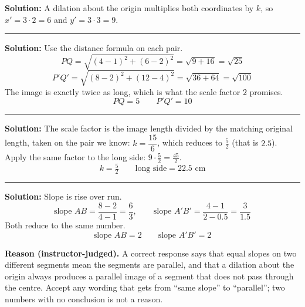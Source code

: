 \documentclass[12pt]{article}
\begin{document}



\textbf{Solution:} \quad A dilation about the origin multiplies both coordinates by $k$, so
$x' = 3 \cdot 2 = 6$ and $y' = 3 \cdot 3 = 9$. 

\vspace{0.25cm}

\noindent\rule{\linewidth}{0.2pt}


\textbf{Solution:} \quad Use the distance formula on each pair.
\[ PQ = \sqrt{(4-1)^2 + (6-2)^2} = \sqrt{9 + 16} = \sqrt{25} \]
\[ P'Q' = \sqrt{(8-2)^2 + (12-4)^2} = \sqrt{36 + 64} = \sqrt{100} \]
The image is exactly twice as long, which is what the scale factor $2$ promises.
\[ \boxed{PQ = 5 \qquad P'Q' = 10} \]

\vspace{0.25cm}

\noindent\rule{\linewidth}{0.2pt}


\textbf{Solution:} \quad The scale factor is the image length divided by the matching original
length, taken on the pair we know: $k = \dfrac{15}{6}$, which reduces to $\tfrac{5}{2}$ (that is
$2.5$). Apply the same factor to the long side: $9 \cdot \tfrac{5}{2} = \tfrac{45}{2}$.
\[ \boxed{k = \tfrac{5}{2} \qquad \text{long side} = 22.5 \text{ cm}} \]

\vspace{0.25cm}

\noindent\rule{\linewidth}{0.2pt}


\textbf{Solution:} \quad Slope is rise over run.
\[ \text{slope } AB = \frac{8 - 2}{4 - 1} = \frac{6}{3}, \qquad
   \text{slope } A'B' = \frac{4 - 1}{2 - 0.5} = \frac{3}{1.5} \]
Both reduce to the same number.
\[ \boxed{\text{slope } AB = 2 \qquad \text{slope } A'B' = 2} \]

\textbf{Reason (instructor-judged).} A correct response says that equal slopes on two different
segments mean the segments are parallel, and that a dilation about the origin always produces a
parallel image of a segment that does not pass through the centre. Accept any wording that gets
from ``same slope'' to ``parallel''; two numbers with no conclusion is not a reason.
\end{document}
